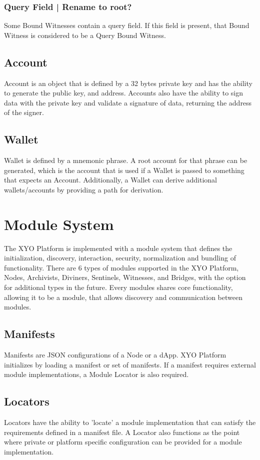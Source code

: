 \documentclass{article}
\begin{document}
\subsubsection{Query Field | Rename to root?}
Some Bound Witnesses contain a query field.  If this field is present, that Bound Witness is considered to be a Query Bound Witness.

\subsection{Account}
Account is an object that is defined by a 32 bytes private key and has the ability to generate the public key, and address.  Accounts also have the ability to sign data with the private key and validate a signature of data, returning the address of the signer.
\subsection{Wallet}
Wallet is defined by a mnemonic phrase.  A root account for that phrase can be generated, which is the account that is used if a Wallet is passed to something that expects an Account.  Additionally, a Wallet can derive additional wallets/accounts by providing a path for derivation.

\clearpage

\section{Module System}
The XYO Platform is implemented with a module system that defines the initialization, discovery, interaction, security, normalization and bundling of functionality.  There are 6 types of modules supported in the XYO Platform, Nodes, Archivists, Diviners, Sentinels, Witnesses, and Bridges, with the option for additional types in the future. Every modules shares core functionality, allowing it to be a module, that allows discovery and communication between modules.

\subsection{Manifests}
Manifests are JSON configurations of a Node or a dApp.
XYO Platform initializes by loading a manifest or set of manifests.  If a manifest requires external module implementations, a Module Locator is also required.

\subsection{Locators}
Locators have the ability to 'locate' a module implementation that can satisfy the requirements defined in a manifest file.  A Locator also functions as the point where private or platform specific configuration can be provided for a module implementation.
\end{document}
